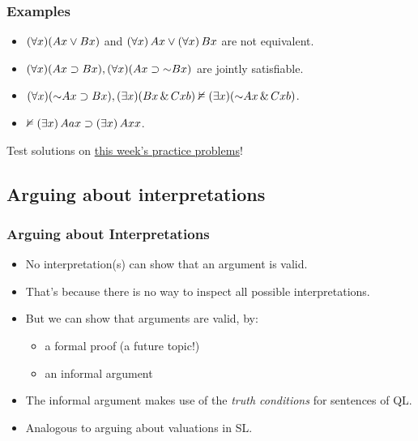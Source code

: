 \begin{frame}
\frametitle{Examples}

\begin{itemize}[<+->]
  \item $(\forall x)(Ax \vee Bx)$ and $(\forall x)\,Ax \vee (\forall x)\,Bx$ are not equivalent.
  \item  $\qt{\forall}{x}(A\qv{x} \eif B\qv{x}), \qt{\forall}{x}(A\qv{x} \eif \enot B\qv{x})$ are jointly satisfiable.
  \item $\qt{\forall}{x}(\enot A\qv{x} \eif B\qv{x}), \qt{\exists}{x}(B\qv{x} \eand C\qr{x}{b})
  \nentails \qt{\exists}{x}(\enot A\qv{x} \eand C\qr{x}{b})$.
  \item $ \nvDash (\exists x)\, Aax \supset (\exists x)\, Axx$.
\end{itemize}
Test solutions on \href{https://carnap.io/assignments/2022\%20Fall,\%2024.241\%20MIT\%20Logic\%201/Week\%209\%20PRACTICE\%20problems\%20for\%20QL\%20Models}{this week's practice problems}!


\end{frame}

\subsection{Arguing about interpretations}

\begin{frame}
\frametitle{Arguing about Interpretations}

\begin{itemize}[<+->]
  \item No interpretation(s) can show that an argument is valid.
  \item That's because there is no way to inspect all possible interpretations.
  \item But we can show that arguments are valid, by:
  \begin{itemize}
    \item a formal proof (a future topic!)
    \item an informal argument
  \end{itemize}
  \item The informal argument makes use of the \emph{truth conditions}
  for sentences of QL.
  \item Analogous to arguing about valuations in SL.
\end{itemize}

\end{frame}

